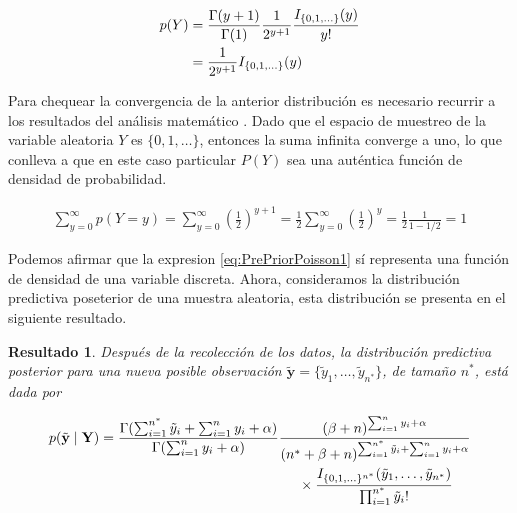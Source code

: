 \documentclass[
  12pt,
  spanish,
]{book}
\newtheorem{proposition}{Resultado}[chapter]
\theoremstyle{definition}
\theoremstyle{definition}
\theoremstyle{definition}
\theoremstyle{definition}
\theoremstyle{remark}
\begin{document}
\begin{align}
\label{eq:PrePriorPoisson1}
p(Y)&=\frac{\Gamma(y+1)}{\Gamma(1)}\frac{1}{2^{y+1}}\frac{I_{\{0,1,\ldots\}}(y)}{y!} \notag\\
&=\frac{1}{2^{y+1}}I_{\{0,1,\ldots\}}(y)
\end{align}

Para chequear la convergencia de la anterior distribución es necesario recurrir a los resultados del análisis matemático \citet[pág. 361]{Apostol}. Dado que el espacio de muestreo de la variable aleatoria \(Y\) es \(\{0,1,\ldots\}\), entonces la suma infinita converge a uno, lo que conlleva a que en este caso particular \(P(Y)\) sea una auténtica función de densidad de probabilidad.

\begin{align*}
\sum_{y=0}^{\infty}p(Y=y)=\sum_{y=0}^{\infty}\left(\frac{1}{2}\right)^{y+1}=\frac{1}{2}\sum_{y=0}^{\infty}\left(\frac{1}{2}\right)^{y}
=\frac{1}{2}\frac{1}{1-1/2}=1
\end{align*}

Podemos afirmar que la expresion \eqref{eq:PrePriorPoisson1} sí representa una función de densidad de una variable discreta. Ahora, consideramos la distribución predictiva poseterior de una muestra aleatoria, esta distribución se presenta en el siguiente resultado.

\begin{proposition}
\protect\hypertarget{prp:ResPoissonPred}{}{\label{prp:ResPoissonPred} }Después de la recolección de los datos, la distribución predictiva posterior para una nueva posible observación \(\tilde{\mathbf{y}}=\{\tilde{y}_1,\ldots,\tilde{y}_{n^*}\}\), de tamaño \(n^*\), está dada por

\begin{align}
p(\tilde{\mathbf{y}} \mid \mathbf{Y})&=\frac{\Gamma(\sum_{i=1}^{n^*}\tilde{y}_i+\sum_{i=1}^ny_i+\alpha)}{\Gamma(\sum_{i=1}^ny_i+\alpha)}
\frac{(\beta+n)^{\sum_{i=1}^ny_i+\alpha}}{({n^*}+\beta+n)^{\sum_{i=1}^{n^*}\tilde{y}_i+\sum_{i=1}^ny_i+\alpha}}\notag\\
&\hspace{5cm}\times
\frac{I_{\{0,1,\ldots\}^{n^*}}(\tilde{y}_1,\ldots,\tilde{y}_{n^*})}{\prod_{i=1}^{n^*}\tilde{y}_i!}
\end{align}
\end{proposition}
\end{document}
